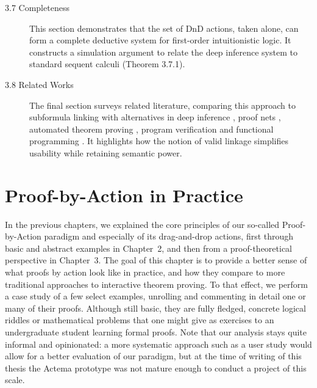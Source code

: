 \documentclass[11pt]{article}
\begin{document}
\begin{description}
\item[3.7 Completeness]
This section demonstrates that the set of DnD actions, taken alone, can form a complete deductive system for first-order intuitionistic logic. It constructs a simulation argument to relate the deep inference system to standard sequent calculi (Theorem 3.7.1).

\item[3.8 Related Works]
The final section surveys related literature, comparing this approach to subformula linking with alternatives in deep inference \cite{DBLP:conf/cade/Chaudhuri21}, proof nets \cite{girard-linear-1987,strasburger-problem-2019,hughes2019firstorder}, automated theorem proving \cite{1674698}, program verification \cite{mulder_unification_2024} and functional programming \cite{elliott-tangible}. It highlights how the notion of valid linkage simplifies usability while retaining semantic power.

\end{description}

\section{Proof-by-Action in Practice}

In the previous chapters, we explained the core principles of our so-called
Proof-by-Action paradigm and especially of its drag-and-drop actions, first
through basic and abstract examples in Chapter~2, and then from a
proof-theoretical perspective in Chapter~3. The goal of this chapter is
to provide a better sense of what proofs by action look like in
practice, and how they compare to more traditional approaches to interactive
theorem proving. To that effect, we perform a case study of a few select
examples, unrolling and commenting in detail one or many of their proofs.
Although still basic, they are fully fledged, concrete logical riddles or
mathematical problems that one might give as exercises to an undergraduate
student learning formal proofs. Note that our analysis stays quite informal
and opinionated: a more systematic approach such as a user study would allow for
a better evaluation of our paradigm, but at the time of writing of this thesis
the Actema prototype was not mature enough to conduct a project of this
scale.
\end{document}
